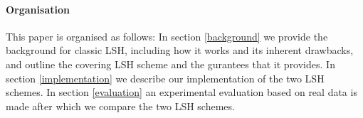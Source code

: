 \paragraph{Organisation} This paper is organised as follows: In section \ref{background} we provide the background for classic LSH, including how it works and its inherent drawbacks, and outline the covering LSH scheme and the gurantees that it provides. In section \ref{implementation} we describe our implementation of the two LSH schemes. In section \ref{evaluation} an experimental evaluation based on real data is made after which we compare the two LSH schemes.
